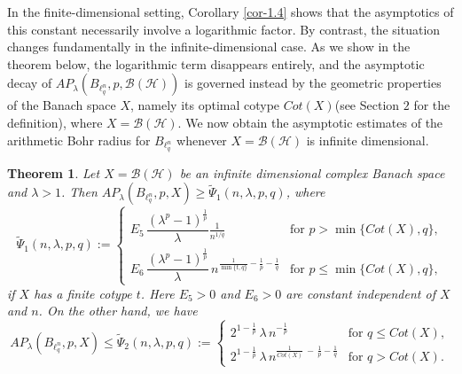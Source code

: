\documentclass[a4paper,11pt, reqno]{amsart}
\newtheorem{thm}{Theorem}[section]
\theoremstyle{definition}
\begin{document}
In the finite-dimensional setting, Corollary \ref{cor-1.4} shows that the asymptotics of this constant necessarily involve a logarithmic factor. By contrast, the situation changes fundamentally in the infinite-dimensional case. As we show in the theorem below, the logarithmic term disappears entirely, and the asymptotic decay of $AP_{\lambda}(B_{\ell^n _q}, p,\mathcal{B}(\mathcal{H}))$ is governed instead by the geometric properties of the Banach space $X$, namely its optimal cotype $Cot(X)$(see Section $2$ for the definition), where $X=\mathcal{B}(\mathcal{H})$. 
	We now obtain the asymptotic estimates of the arithmetic Bohr radius for $B_{\ell^n _q}$ whenever $X=\mathcal{B}(\mathcal{H})$ is infinite dimensional.	
	\begin{thm} \label{thm-1.3-atm}
		Let $X=\mathcal{B}(\mathcal{H})$ be an infinite dimensional complex Banach space  and $\lambda>1$. Then $AP_{\lambda}(B_{\ell^n _q}, p,X) \geq \tilde{\Psi}_{1}(n,\lambda,p,q)$, where
		\begin{equation*}
			\tilde{\Psi}_{1}(n,\lambda,p,q):=	\begin{cases}
				
				E_{5}\,\dfrac{\left(\lambda^p -1\right)^{\frac{1}{p}}}{\lambda} \frac{1}{n^{1/q}} & \text{for $p>\min \{Cot(X),q\}$}, \\[2mm]
				E_{6}\, \dfrac{\left(\lambda^p -1\right)^{\frac{1}{p}}}{\lambda}\, n^{{\frac{1}{\min\{t,q\}}}-\frac{1}{p}-\frac{1}{q}} & \text{for $p\leq \min \{Cot(X),q\}$},
			\end{cases}
		\end{equation*}
		if $X$ has a finite cotype $t$. Here $E_{5}>0$ and $E_{6}>0$ are constant independent of $X$ and $n$. 
		On the other hand, we have
		\begin{equation*}
			AP_{\lambda}(B_{\ell^n _q}, p,X) \leq \tilde{\Psi}_{2}(n,\lambda,p,q):=	\begin{cases}	
				2^{1-\frac{1}{p}}\, \lambda\, n^{- \frac{1}{p}} & \text{for $q\leq Cot(X)$}, \\[2mm]
				2^{1-\frac{1}{p}}\,\lambda\, n^{\frac{1}{Cot(X)}\, - \,\frac{1}{p}-\frac{1}{q}} & \text{for $q>Cot(X)$}.
			\end{cases}
		\end{equation*}
	\end{thm}
	
\end{document}
